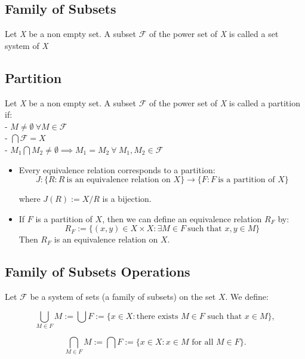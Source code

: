 \subsection{Family of Subsets}
Let \emph{X} be a non empty set. A subset \(\mathscr{F}\) of the power set of \textit{X} is called a set system of \textit{X}

\subsection{Partition}
Let \emph{X} be a non empty set. A subset \(\mathscr{F}\) of the power set of \textit{X} is called a partition if:\\
- \(M \neq  \emptyset\ \forall M \in \mathscr{F}\)\\
- \(\bigcap \mathscr{F} = X\)\\
- \(M_1 \bigcap M_2 \ne \emptyset \implies M_1 = M_2\ \forall\ M_1, M_2 \in \mathscr{F} \)

\begin{itemize}[label=\(-\)]

	\item Every equivalence relation corresponds to a partition:
	      \[
		      J: \{ R : R\ \text{is an equivalence relation on } X\} \to \{ F: F\ \text{is a partition of } X\}
	      \]

	      where \( J(R) := X / R \) is a bijection.

	\item If \( F \) is a partition of \( X \), then we can define an equivalence relation \( R_F \) by:
	      \[
		      R_F := \{ (x, y) \in X \times X : \exists M \in F\ \text{such that } x, y \in M \}
	      \]
	      Then \( R_F \) is an equivalence relation on \( X \).

\end{itemize}


\subsection{Family of Subsets Operations}
Let \(\mathscr{F}\) be a system of sets (a family of subsets) on the set \( X \). We define:

\[
	\bigcup_{M \in F} M := \bigcup F := \{ x \in X : \text{there exists } M \in F \text{ such that } x \in M \} ,
\]

\[
	\bigcap_{M \in F} M := \bigcap F := \{ x \in X : x \in M \text{ for all } M \in F \} .
\]
\newpage